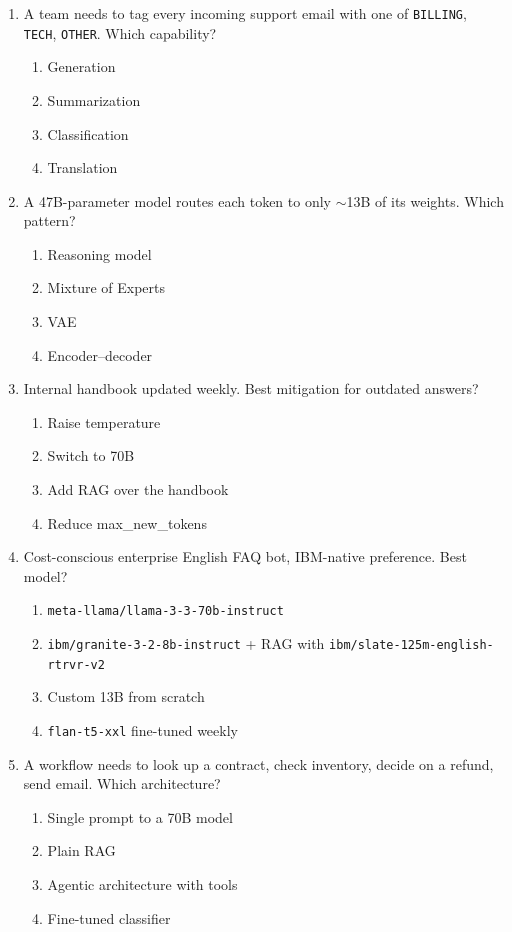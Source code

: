 \begin{enumerate}[leftmargin=*]

\item A team needs to tag every incoming support email with one of \texttt{BILLING}, \texttt{TECH}, \texttt{OTHER}. Which capability?
\begin{enumerate}[label=\Alph*.]
  \item Generation \item Summarization \item Classification \item Translation
\end{enumerate}

\item A 47B-parameter model routes each token to only $\sim$13B of its weights. Which pattern?
\begin{enumerate}[label=\Alph*.]
  \item Reasoning model \item Mixture of Experts \item VAE \item Encoder--decoder
\end{enumerate}

\item Internal handbook updated weekly. Best mitigation for outdated answers?
\begin{enumerate}[label=\Alph*.]
  \item Raise temperature \item Switch to 70B \item Add RAG over the handbook \item Reduce max\_new\_tokens
\end{enumerate}

\item Cost-conscious enterprise English FAQ bot, IBM-native preference. Best model?
\begin{enumerate}[label=\Alph*.]
  \item \texttt{meta-llama/llama-3-3-70b-instruct}
  \item \texttt{ibm/granite-3-2-8b-instruct} + RAG with \texttt{ibm/slate-125m-english-rtrvr-v2}
  \item Custom 13B from scratch \item \texttt{flan-t5-xxl} fine-tuned weekly
\end{enumerate}

\item A workflow needs to look up a contract, check inventory, decide on a refund, send email. Which architecture?
\begin{enumerate}[label=\Alph*.]
  \item Single prompt to a 70B model \item Plain RAG
  \item Agentic architecture with tools \item Fine-tuned classifier
\end{enumerate}


\end{enumerate}

